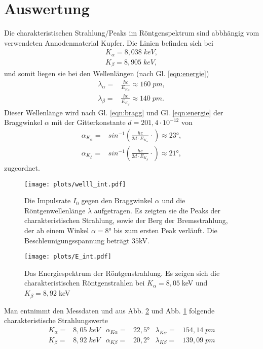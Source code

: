 \newpage
\section{Auswertung}
Die charakteristischen Strahlung/Peaks im Röntgenspektrum sind abbhängig vom 
verwendeten Annodenmaterial Kupfer. Die Linien befinden sich bei \cite{literatur}
\begin{align*}
    K_{\alpha}=8,038\;\si{keV},\\
    K_{\beta}=8,905\;\si{keV},
\end{align*}
und somit liegen sie bei den Wellenlängen (nach Gl. \ref{eqn:energie})
\begin{align*}
    \lambda_{\alpha} =& \frac{hc}{E_{K_{\alpha}}}\approx 160\;\si{pm},\\
    \lambda_{\beta}  =& \frac{hc}{E_{K_{\beta}}}\approx 140 \;\si{pm} .
\end{align*}
Dieser Wellenlänge wird nach Gl. \ref{eqn:bragg} und Gl. \ref{eqn:energie} der Braggwinkel $\alpha$ 
mit der Gitterkonstante $d=201,4\cdot 10^{-12}$ von
\begin{align*}
    \alpha_{K_{\alpha}}=&sin^{-1}\left(\frac{hc}{2d \cdot E_{K_{\alpha}}}\cdot\right)\approx 23°,\\
    \alpha_{K_{\beta}}=&sin^{-1}\left(\frac{hc}{2d \cdot E_{K_{\beta}}}\cdot\right)\approx 21°,
\end{align*}
zugeordnet.

\begin{figure}[H]
    \centering
    \texttt{[image: plots/welll\_int.pdf]}
    \caption{Die Impulsrate $I_0$ gegen den Braggwinkel $\alpha$ und die 
    Röntgenwellenlänge $\lambda$ aufgetragen. Es zeigten sie die Peaks der 
    charakteristischen Strahlung, sowie der Berg der Bremsstrahlung, der ab einem 
    Winkel $\alpha=8°$ bis zum ersten Peak verläuft. Die Beschleunigungsspannung 
    beträgt $35$kV.}
    \label{fig:braggw}
\end{figure}

\begin{figure}[H]
    \centering
    \texttt{[image: plots/E\_int.pdf]}
    \caption{Das Energiespektrum der Röntgenstrahlung. Es zeigen sich
    die charakteristischen Röntgenstrahlen bei $K_{\alpha}=8,05\;$keV und 
    $K_{\beta}=8,92\;$keV}
    \label{fig:energie}
\end{figure}


Man entnimmt den Messdaten und aus Abb. \ref{fig:energie} und Abb. \ref{fig:braggw} 
folgende charakteristische Strahlungswerte
\begin{align*}
    K_{\alpha}=&8,05\;\si{keV} &\alpha_{K\alpha}=&22,5°& \lambda_{K\alpha}=&154,14\;\si{pm}\\ 
    K_{\beta}=&8,92\;\si{keV} &\alpha_{K\beta}=&20,2° &\lambda_{K\beta}=&139,09\;\si{pm}\\
\end{align*}



